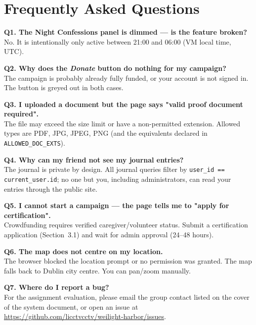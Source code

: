 \section{Frequently Asked Questions}

\textbf{Q1. The Night Confessions panel is dimmed — is the feature
broken?}\\
No. It is intentionally only active between 21:00 and 06:00 (VM local
time, UTC).

\textbf{Q2. Why does the \emph{Donate} button do nothing for my
campaign?}\\
The campaign is probably already fully funded, or your account is not
signed in. The button is greyed out in both cases.

\textbf{Q3. I uploaded a document but the page says "valid proof
document required".}\\
The file may exceed the size limit or have a non-permitted extension.
Allowed types are PDF, JPG, JPEG, PNG (and the equivalents declared in
\texttt{ALLOWED\_DOC\_EXTS}).

\textbf{Q4. Why can my friend not see my journal entries?}\\
The journal is private by design. All journal queries filter by
\texttt{user\_id == current\_user.id}; no one but you, including
administrators, can read your entries through the public site.

\textbf{Q5. I cannot start a campaign — the page tells me to "apply for
certification".}\\
Crowdfunding requires verified caregiver/volunteer status. Submit a
certification application (Section~3.1) and wait for admin approval
(24–48 hours).

\textbf{Q6. The map does not centre on my location.}\\
The browser blocked the location prompt or no permission was granted.
The map falls back to Dublin city centre. You can pan/zoom manually.

\textbf{Q7. Where do I report a bug?}\\
For the assignment evaluation, please email the group contact listed on
the cover of the system document, or open an issue at
\url{https://github.com/licctvcctv/weilight-harbor/issues}.

\appendix
